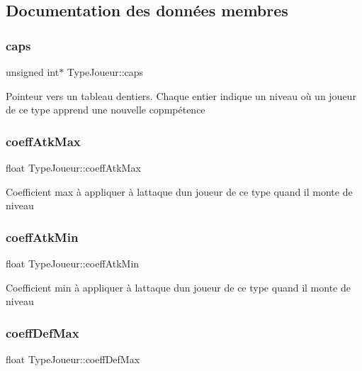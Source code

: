 \subsection{Documentation des données membres}
\mbox{\label{structTypeJoueur_a360f632afa23803fc525c5c58368cbb4}} 
\subsubsection{\texorpdfstring{caps}{caps}}
{\footnotesize\ttfamily unsigned int$\ast$ Type\+Joueur\+::caps}

Pointeur vers un tableau d\textquotesingle{}entiers. Chaque entier indique un niveau où un joueur de ce type apprend une nouvelle copmpétence \mbox{\label{structTypeJoueur_a913539852155d8d9cd7a6bf701924ea2}} 
\subsubsection{\texorpdfstring{coeff\+Atk\+Max}{coeffAtkMax}}
{\footnotesize\ttfamily float Type\+Joueur\+::coeff\+Atk\+Max}

Coefficient max à appliquer à l\textquotesingle{}attaque d\textquotesingle{}un joueur de ce type quand il monte de niveau \mbox{\label{structTypeJoueur_afaf6b4017f0bf253544c4c13406bc6ca}} 
\subsubsection{\texorpdfstring{coeff\+Atk\+Min}{coeffAtkMin}}
{\footnotesize\ttfamily float Type\+Joueur\+::coeff\+Atk\+Min}

Coefficient min à appliquer à l\textquotesingle{}attaque d\textquotesingle{}un joueur de ce type quand il monte de niveau \mbox{\label{structTypeJoueur_a4d1bbb9bc416de504f8cfe6c16fb4993}} 
\subsubsection{\texorpdfstring{coeff\+Def\+Max}{coeffDefMax}}
{\footnotesize\ttfamily float Type\+Joueur\+::coeff\+Def\+Max}

